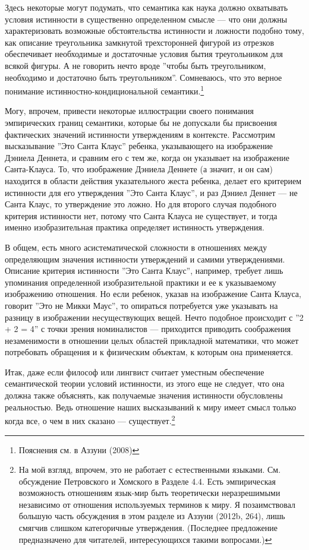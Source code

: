 \documentclass[11pt]{book}
\begin{document}
Здесь некоторые могут подумать, что семантика как наука должно охватывать условия истинности в существенно определенном смысле --- что они должны характеризовать возможные обстоятельства истинности и ложности подобно тому, как описание треугольника замкнутой трехсторонней фигурой из отрезков обеспечивает необходимые и достаточные условия бытия треугольником для всякой фигуры. А не говорить нечто вроде ''чтобы быть треугольником, необходимо и достаточно быть треугольником''. Сомневаюсь, что это верное понимание истинностно-кондициональной семантики.\footnote{Пояснения см. в Аззуни (2008)}

Могу, впрочем, привести некоторые иллюстрации своего понимания эмпирических границ семантики, которые бы не допускали бы присвоения фактических значений истинности утверждениям в контексте. Рассмотрим высказывание ''Это Санта Клаус'' ребенка, указывающего на изображение Дэниела Деннета, и сравним его с тем же, когда он указывает на изображение Санта-Клауса. То, что изображение Дэниела Деннете (а значит, и он сам) находится в области действия указательного жеста ребенка, делает его критерием истинности для его утверждения ''Это Санта Клаус'', и раз Дэниел Деннет --- не Санта Клаус, то утверждение это ложно. Но для второго случая подобного критерия истинности нет, потому что Санта Клауса не существует, и тогда именно изобразительная практика определяет истинность утверждения.

В общем, есть много асистематической сложности в отношениях между определяющим значения истинности утверждений и самими утверждениями. Описание критерия истинности ''Это Санта Клаус'', например, требует лишь упоминания определенной изобразительной практики и ее к указываемому изображению отношения. Но если ребенок, указав на изображение Санта Клауса, говорит ''Это не Микки Маус'', то опираться потребуется уже указывать на разницу в изображении несуществующих вещей. Нечто подобное происходит с ''2 + 2 = 4'' с точки зрения номиналистов --- приходится приводить соображения незаменимости в отношении целых областей прикладной математики, что может потребовать обращения и к физическим объектам, к которым она применяется.

Итак, даже если философ или лингвист считает уместным обеспечение семантической теории условий истинности, из этого еще не следует, что она должна также объяснять, как получаемые значения истинности обусловлены реальностью. Ведь отношение наших высказываний к миру имеет смысл только когда все, о чем в них сказано --- существует.\footnote{На мой взгляд, впрочем, это не работает с естественными языками. См. обсуждение Петровского и Хомского в Разделе 4.4. Есть эмпирическая возможность отношениям язык-мир быть теоретически неразрешимыми независимо от отношения используемых терминов к миру. Я позаимствовал большую часть обсуждения в этом разделе из Аззуни (2012b, 264), лишь смягчив слишком категоричные утверждения. (Последнее предложение предназначено для читателей, интересующихся такими вопросами.)}
\end{document}
